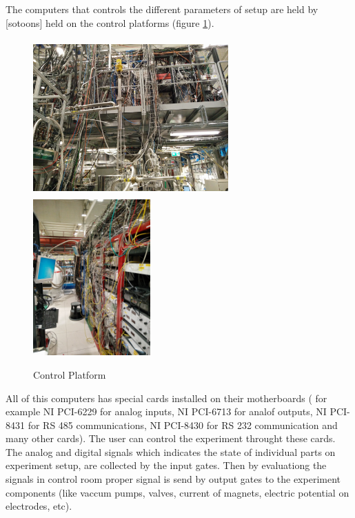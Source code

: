 \documentclass{article}
\begin{document}
The computers that controls the different parameters of setup are held by [sotoons] held on the control platforms (figure \ref{platform}). 


\begin{figure}[h]

\includegraphics[height=60mm, width=75mm]{control_platform-1}
\includegraphics[width=45mm]{control_plattform2}
\caption{Control Platform}
\label{platform}
\end{figure}		
	
All of this computers has special cards installed on their motherboards ( for example NI PCI-6229 for analog inputs, NI PCI-6713 for analof outputs, NI PCI-8431 for RS 485 communications, NI PCI-8430 for RS 232 communication and many other cards). The user can control the experiment throught these cards. The analog and digital signals which indicates the state of individual parts on experiment setup, are collected by the input gates. Then by evaluationg the signals in control room proper signal is send by output gates to the experiment components (like vaccum pumps, valves, current of magnets, electric potential on electrodes, etc).
\end{document}
